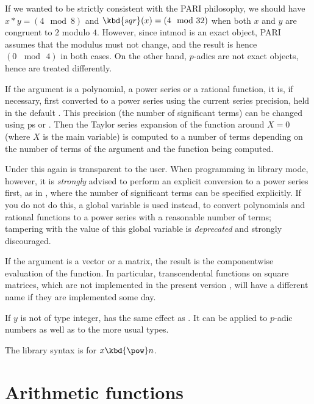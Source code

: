  If we wanted to be strictly consistent with
the PARI philosophy, we should have $x*y = (4 \mod 8)$ and $\kbd{sqr}(x) =
(4 \mod 32)$ when both $x$ and $y$ are congruent to $2$ modulo $4$.
However, since intmod is an exact object, PARI assumes that the modulus
must not change, and the result is hence $(0\, \mod\, 4)$ in both cases. On
the other hand, $p$-adics are not exact objects, hence are treated
differently.

\item If the argument is a polynomial, a power series or a rational function,
it is, if necessary, first converted to a power series using the current
series precision, held in the default . This precision
(the number of significant terms) can be changed using \b{ps} or
. Then the Taylor series expansion of the
function around $X=0$ (where $X$ is the main variable) is computed to a
number of terms depending on the number of terms of the argument and the
function being computed.

Under  this again is transparent to the user. When programming in
library mode, however, it is \emph{strongly} advised to perform an explicit
conversion to a power series first, as in ,
where the number of significant terms  can be specified
explicitly. If you do not do this, a global variable  is used
instead, to convert polynomials and rational functions to a power series with
a reasonable number of terms; tampering with the value of this global
variable is \emph{deprecated} and strongly discouraged.


\item If the argument is a vector or a matrix, the result is the
componentwise evaluation of the function. In particular, transcendental
functions on square matrices, which are not implemented in the present
version \vers, will have a different name if they are implemented some day.

\subseckbd{\pow} If $y$ is not of type integer,  has the same
effect as . It can be applied to $p$-adic numbers as well
as to the more usual types.

The library syntax is 
for $x\hbox{\kbd{\pow}}n$.


\section{Arithmetic functions}\label{se:arithmetic}

